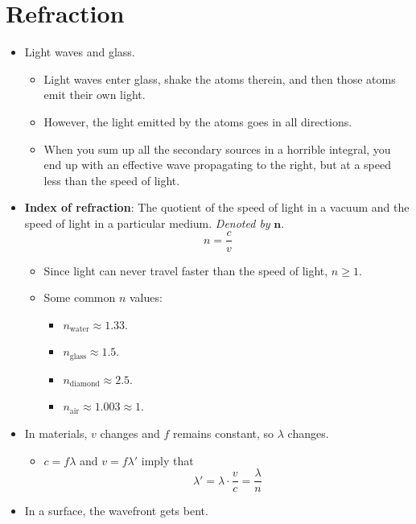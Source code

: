 \documentclass[../notes.tex]{subfiles}
\begin{document}
\section{Refraction}
\begin{itemize}
    \item Light waves and glass.
    \begin{itemize}
        \item Light waves enter glass, shake the atoms therein, and then those atoms emit their own light.
        \item However, the light emitted by the atoms goes in all directions.
        \item When you sum up all the secondary sources in a horrible integral, you end up with an effective wave propagating to the right, but at a speed less than the speed of light.
    \end{itemize}
    \item \textbf{Index of refraction}: The quotient of the speed of light in a vacuum and the speed of light in a particular medium. \emph{Denoted by} $\bm{n}$.
    \begin{equation*}
        n = \frac{c}{v}
    \end{equation*}
    \begin{itemize}
        \item Since light can never travel faster than the speed of light, $n\geq 1$.
        \item Some common $n$ values:
        \begin{itemize}
            \item $n_\text{water}\approx 1.33$.
            \item $n_\text{glass}\approx 1.5$.
            \item $n_\text{diamond}\approx 2.5$.
            \item $n_\text{air}\approx 1.003\approx 1$.
        \end{itemize}
    \end{itemize}
    \item In materials, $v$ changes and $f$ remains constant, so $\lambda$ changes.
    \begin{itemize}
        \item $c=f\lambda$ and $v=f\lambda'$ imply that
        \begin{equation*}
            \lambda' = \lambda\cdot\frac{v}{c} = \frac{\lambda}{n}
        \end{equation*}
    \end{itemize}
    \item In a surface, the wavefront gets bent.
    \begin{figure}[h!]
        \centering
\end{figure}
\end{itemize}
\end{document}
